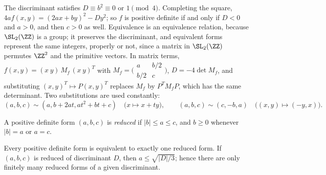 The discriminant satisfies $D \equiv b^2 \equiv 0$ or $1 \pmod 4$. Completing the square, $4af(x, y) = (2ax + by)^2 - Dy^2$; so $f$ is positive definite if and only if $D < 0$ and $a > 0$, and then $c > 0$
as well. Equivalence is an equivalence relation, because $\SL_2(\ZZ)$ is a group; it preserves the discriminant, and equivalent forms represent the same integers, properly or not, since a matrix in
$\SL_2(\ZZ)$ permutes $\ZZ^2$ and the primitive vectors. In matrix terms, $f(x, y) = (x\ y)\,M_f\,(x\ y)^T$ with $M_f = \bigl(\begin{smallmatrix}a & b/2\\ b/2 & c\end{smallmatrix}\bigr)$, $D = -4\det M_f$, and
substituting $(x, y)^T \mapsto P(x, y)^T$ replaces $M_f$ by $P^TM_fP$, which has the same determinant. Two substitutions are used constantly:
\[
(a, b, c) \sim (a, b + 2at, at^2 + bt + c) \quad \bigl(x \mapsto x + ty\bigr), \qquad (a, b, c) \sim (c, -b, a) \quad \bigl((x, y) \mapsto (-y, x)\bigr).
\]

\begin{definition}\label{number-theory:definition-reduced-form}
A positive definite form $(a, b, c)$ is \emph{reduced} if $|b| \leq a \leq c$, and $b \geq 0$ whenever $|b| = a$ or $a = c$.
\end{definition}

\begin{theorem}\label{number-theory:theorem-reduction}
Every positive definite form is equivalent to exactly one reduced form. If $(a, b, c)$ is reduced of discriminant $D$, then $a \leq \sqrt{|D|/3}$; hence there are only finitely many reduced forms of a
given discriminant.
\end{theorem}

